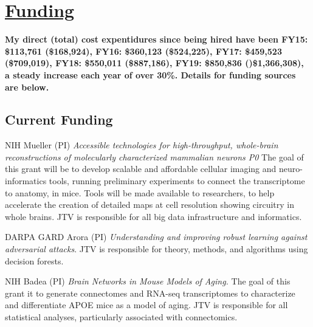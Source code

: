 \documentclass[10pt,colorlinks=true,urlcolor=blue]{moderncv}
\begin{document}
\begin{refsection}
\nocite{*}
\printbibliography[%
    title=\href{https://neurodata.io/posters/}{Abstracts \& Posters},%
    heading=bibliography,%
    ]
\end{refsection}




\section{\href{https://neurodata.io/about/funding/}{Funding}}

\textbf{My direct (total) cost expentidures since being hired have been
FY15:	\$113,761 (\$168,924), 
FY16:	\$360,123 (\$524,225),
FY17:	\$459,523 (\$709,019),
FY18:	\$550,011 (\$887,186),
FY19:	\$850,836 ()\$1,366,308), 
a steady increase each year of over 30\%. Details for funding sources are below.
}


\subsection{Current Funding}


    {NIH}%
    {}
    {Mueller (PI)}
    {\emph{Accessible technologies for high-throughput, whole-brain reconstructions of molecularly characterized mammalian neurons  P0} 
    The  goal of this grant will be to develop scalable
    and affordable cellular imaging and neuro-informatics tools,
    running preliminary experiments to connect the transcriptome to
    anatomy, in mice. Tools will be made available to researchers,
    to help accelerate the creation of detailed maps at cell
    resolution showing circuitry in whole brains.}
    {JTV is responsible for all big data infrastructure and informatics.}
    {}
    
    {DARPA GARD}%
    {}
    {Arora (PI)}
    {\emph{Understanding and improving robust learning against adversarial attacks}.}
    {JTV is responsible for theory, methods, and algorithms using decision forests.}
    {}

    {NIH}%
    {}
    {Badea (PI)}
    {\emph{Brain Networks in Mouse Models of Aging.} 
    The  goal of this grant it to generate connectomes and RNA-seq transcriptomes to characterize and differentiate APOE mice as a model of aging.}
    {JTV is responsible for all statistical analyses, particularly associated with connectomics.}
    {}
\end{document}
